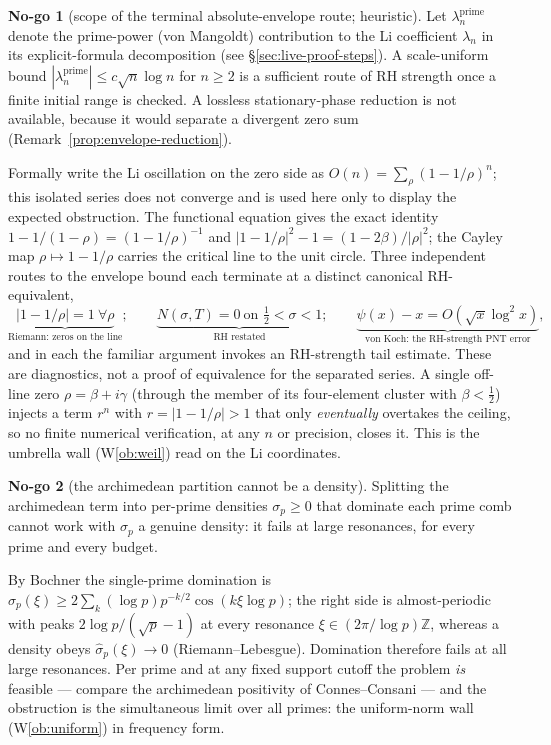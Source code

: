 \documentclass[11pt]{amsart}
\theoremstyle{definition}
\theoremstyle{remark}
\theoremstyle{definition}
\newtheorem{nogo}{No-go}[section]
\newcommand{\Z}{\mathbb{Z}}
\begin{document}
\begin{nogo}[scope of the terminal absolute-envelope route; heuristic]\label{ng:envelope}
Let $\lambda_n^{\mathrm{prime}}$ denote the prime-power (von Mangoldt) contribution to the Li coefficient
$\lambda_n$ in its explicit-formula decomposition (see \S\ref{sec:live-proof-steps}). A scale-uniform bound
$|\lambda_n^{\mathrm{prime}}|\le c\sqrt n\log n$ for $n\ge2$ is a sufficient route of RH strength once a
finite initial range is checked.  A lossless stationary-phase reduction is not available, because it would
separate a divergent zero sum (Remark~\ref{prop:envelope-reduction}).
\end{nogo}
\noindent Formally write the Li oscillation on the zero side as
$O(n)=\sum_\rho(1-1/\rho)^n$; this isolated series does not converge and is used here only to display
the expected obstruction. The functional equation
gives the exact identity $1-1/(1-\rho)=(1-1/\rho)^{-1}$ and $|1-1/\rho|^2-1=(1-2\beta)/|\rho|^2$; the
Cayley map $\rho\mapsto1-1/\rho$ carries the critical line to the unit circle. Three independent routes to
the envelope bound each terminate at a distinct canonical RH-equivalent,
\[
   \underbrace{|1-1/\rho|=1\ \forall\rho}_{\text{Riemann: zeros on the line}};\qquad
   \underbrace{N(\sigma,T)=0\ \text{on }\tfrac12<\sigma<1}_{\text{RH restated}};\qquad
   \underbrace{\psi(x)-x=O(\sqrt x\log^2 x)}_{\text{von Koch: the RH-strength PNT error}},
\]
and in each the familiar argument invokes an RH-strength tail estimate.  These are diagnostics, not
a proof of equivalence for the separated series. A single off-line zero $\rho=\beta+i\gamma$ (through
the member of its four-element cluster with $\beta<\tfrac12$) injects a term $r^n$ with
$r=|1-1/\rho|>1$ that only \emph{eventually} overtakes the ceiling, so no finite numerical
verification, at any $n$ or precision, closes it. This is the umbrella wall (W\ref{ob:weil}) read on the
Li coordinates.

\begin{nogo}[the archimedean partition cannot be a density]\label{ng:partition}
Splitting the archimedean term into per-prime densities $\sigma_p\ge0$ that dominate each prime comb
cannot work with $\sigma_p$ a genuine density: it fails at large resonances, for every prime and every
budget.
\end{nogo}
\noindent By Bochner the single-prime domination is $\hat\sigma_p(\xi)\ge2\sum_k(\log p)p^{-k/2}
\cos(k\xi\log p)$; the right side is almost-periodic with peaks $2\log p/(\sqrt p-1)$ at every resonance
$\xi\in(2\pi/\log p)\Z$, whereas a density obeys $\hat\sigma_p(\xi)\to0$ (Riemann--Lebesgue). Domination
therefore fails at all large resonances. Per prime and at any fixed support cutoff the problem \emph{is}
feasible --- compare the archimedean positivity of Connes--Consani \cite{connesconsani2021} --- and the obstruction is the simultaneous limit over all primes: the
uniform-norm wall (W\ref{ob:uniform}) in frequency form.
\end{document}
